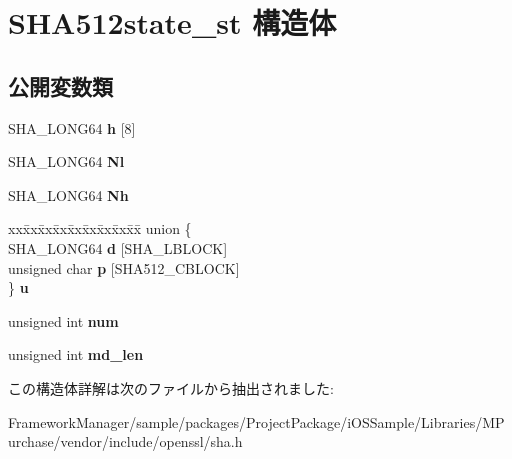 \hypertarget{struct_s_h_a512state__st}{}\section{S\+H\+A512state\+\_\+st 構造体}
\label{struct_s_h_a512state__st}
\subsection*{公開変数類}
\begin{DoxyCompactItemize}
\item 
\hypertarget{struct_s_h_a512state__st_a883844a48a6badf07ab8d5a3b42fa0f6}{}S\+H\+A\+\_\+\+L\+O\+N\+G64 {\bfseries h} \mbox{[}8\mbox{]}\label{struct_s_h_a512state__st_a883844a48a6badf07ab8d5a3b42fa0f6}

\item 
\hypertarget{struct_s_h_a512state__st_a8adc6d1037d156b3adcb14773fa8fe90}{}S\+H\+A\+\_\+\+L\+O\+N\+G64 {\bfseries Nl}\label{struct_s_h_a512state__st_a8adc6d1037d156b3adcb14773fa8fe90}

\item 
\hypertarget{struct_s_h_a512state__st_acfe2405c1f495e7fe24c837ef4a7a9e1}{}S\+H\+A\+\_\+\+L\+O\+N\+G64 {\bfseries Nh}\label{struct_s_h_a512state__st_acfe2405c1f495e7fe24c837ef4a7a9e1}

\item 
\hypertarget{struct_s_h_a512state__st_a3dd3ed8be006625fbae68aefaab1f483}{}\begin{tabbing}
xx\=xx\=xx\=xx\=xx\=xx\=xx\=xx\=xx\=\kill
union \{\\
\>SHA\_LONG64 {\bfseries d} \mbox{[}SHA\_LBLOCK\mbox{]}\\
\>unsigned char {\bfseries p} \mbox{[}SHA512\_CBLOCK\mbox{]}\\
\} {\bfseries u}\label{struct_s_h_a512state__st_a3dd3ed8be006625fbae68aefaab1f483}
\\

\end{tabbing}\item 
\hypertarget{struct_s_h_a512state__st_ae3ba23906ed2416ed3fae1765cf3c0f0}{}unsigned int {\bfseries num}\label{struct_s_h_a512state__st_ae3ba23906ed2416ed3fae1765cf3c0f0}

\item 
\hypertarget{struct_s_h_a512state__st_ac2699bd40af3279042712d23b79fb3db}{}unsigned int {\bfseries md\+\_\+len}\label{struct_s_h_a512state__st_ac2699bd40af3279042712d23b79fb3db}

\end{DoxyCompactItemize}


この構造体詳解は次のファイルから抽出されました\+:\begin{DoxyCompactItemize}
\item 
Framework\+Manager/sample/packages/\+Project\+Package/i\+O\+S\+Sample/\+Libraries/\+M\+Purchase/vendor/include/openssl/sha.\+h\end{DoxyCompactItemize}
